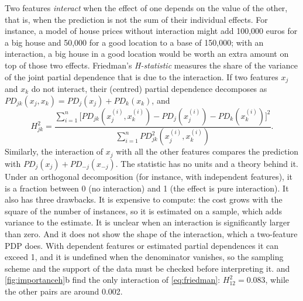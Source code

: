 Two features \emph{interact} when the effect of one depends on the value of the other, that is, when
the prediction is not the sum of their individual effects. For instance, a model of house prices
without interaction might add 100,000 euros for a big house and 50,000 for a good location to a base
of 150,000; with an interaction, a big house in a good location would be worth an extra amount on top
of those two effects. Friedman's \emph{H-statistic} \citep{friedman2008predictive} measures the share of
the variance of the joint partial dependence that is due to the interaction. If two features $x_j$
and $x_k$ do not interact, their (centred) partial dependence decomposes as
$PD_{jk}(x_j,x_k)=PD_j(x_j)+PD_k(x_k)$, and
\begin{equation}
  H^2_{jk}=\frac{\sum_{i=1}^{n}\bigl[PD_{jk}(x_j^{(i)},x_k^{(i)})-PD_j(x_j^{(i)})-PD_k(x_k^{(i)})\bigr]^2}
                {\sum_{i=1}^{n}PD_{jk}^2(x_j^{(i)},x_k^{(i)})}.
\end{equation}
Similarly, the interaction of $x_j$ with all the other features compares the prediction with
$PD_j(x_j)+PD_{-j}(x_{-j})$. The statistic has no units and a theory behind it. Under an orthogonal decomposition (for instance, with independent
features), it is a fraction between 0 (no interaction) and 1 (the
effect is pure interaction). It also has three drawbacks. It is expensive to compute: the cost
grows with the square of the number of instances, so it is estimated on a sample, which adds
variance to the estimate. It is unclear when an interaction is significantly larger than zero. And it
does not show the shape of the interaction, which a two-feature PDP does. With dependent features or estimated partial dependences it can exceed 1, and it is
undefined when the denominator vanishes, so the sampling scheme and the support of the data must be
checked before interpreting it.  and
\cref{fig:importanceh}b find the only interaction of \cref{eq:friedman}: $H^2_{12}=0.083$, while the other
pairs are around 0.002.

